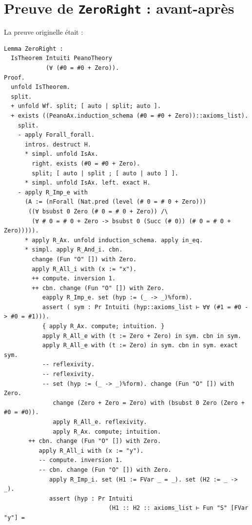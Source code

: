 \documentclass[a4paper]{article}
\theoremstyle{remark}
\theoremstyle{remark}
\theoremstyle{remark}
\theoremstyle{definition}
\theoremstyle{definition}
\theoremstyle{definition}
\begin{document}


\section{Preuve de \texttt{ZeroRight} : avant-après}\label{beforeafter_zeroright}

La preuve originelle était :
\begin{verbatim}
Lemma ZeroRight :
  IsTheorem Intuiti PeanoTheory
            (∀ (#0 = #0 + Zero)).
Proof.
  unfold IsTheorem.
  split.
  + unfold Wf. split; [ auto | split; auto ].
  + exists ((PeanoAx.induction_schema (#0 = #0 + Zero))::axioms_list).
    split.
    - apply Forall_forall.
      intros. destruct H.
      * simpl. unfold IsAx.
        right. exists (#0 = #0 + Zero).
        split; [ auto | split ; [ auto | auto ] ].
      * simpl. unfold IsAx. left. exact H.
    - apply R_Imp_e with
      (A := (nForall (Nat.pred (level (# 0 = # 0 + Zero)))
       ((∀ bsubst 0 Zero (# 0 = # 0 + Zero)) /\
        (∀ # 0 = # 0 + Zero -> bsubst 0 (Succ (# 0)) (# 0 = # 0 + Zero))))).
      * apply R_Ax. unfold induction_schema. apply in_eq.
      * simpl. apply R_And_i. cbn.
        change (Fun "O" []) with Zero.
        apply R_All_i with (x := "x").
        ++ compute. inversion 1.
        ++ cbn. change (Fun "O" []) with Zero.
           eapply R_Imp_e. set (hyp := (_ -> _)%form).
           assert ( sym : Pr Intuiti (hyp::axioms_list ⊢ ∀∀ (#1 = #0 -> #0 = #1))).
           { apply R_Ax. compute; intuition. }
           apply R_All_e with (t := Zero + Zero) in sym. cbn in sym.
           apply R_All_e with (t := Zero) in sym. cbn in sym. exact sym.
           -- reflexivity.
           -- reflexivity.
           -- set (hyp := (_ -> _)%form). change (Fun "O" []) with Zero.
              change (Zero + Zero = Zero) with (bsubst 0 Zero (Zero + #0 = #0)).
              apply R_All_e. reflexivity.
              apply R_Ax. compute; intuition.
       ++ cbn. change (Fun "O" []) with Zero.
          apply R_All_i with (x := "y").
          -- compute. inversion 1.
          -- cbn. change (Fun "O" []) with Zero.
             apply R_Imp_i. set (H1 := FVar _ = _). set (H2 := _ -> _).
             assert (hyp : Pr Intuiti
                              (H1 :: H2 :: axioms_list ⊢ Fun "S" [FVar "y"] =

\end{verbatim}
\end{document}
